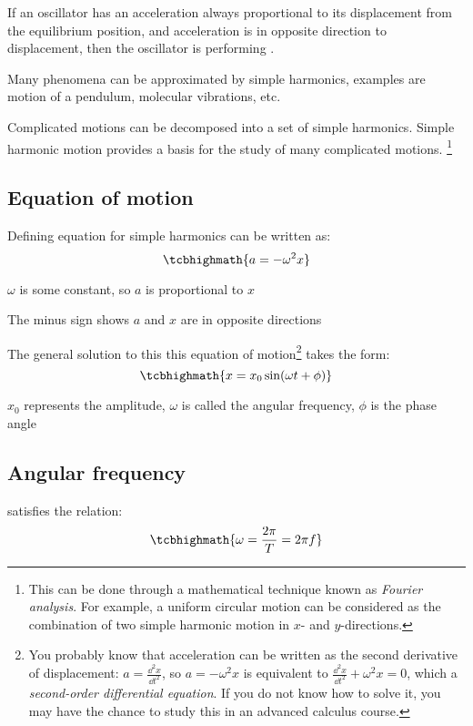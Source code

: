 \begin{ilight}
	If an oscillator has an acceleration always proportional to its displacement from the equilibrium position, and acceleration is in opposite direction to displacement, then the oscillator is performing .
\end{ilight}

Many phenomena can be approximated by simple harmonics, examples are motion of a pendulum, molecular vibrations, etc.

Complicated motions can be decomposed into a set of simple harmonics. Simple harmonic motion provides a basis for the study of many complicated motions.
\footnote{This can be done through a mathematical technique known as \emph{Fourier analysis}. For example, a uniform circular motion can be considered as the combination of two simple harmonic motion in $x$- and $y$-directions.}

\subsection{Equation of motion}

Defining equation for simple harmonics can be written as: $$\tcbhighmath{a=-\omega^2 x}$$

$\omega$ is some constant, so $a$ is proportional to $x$

The minus sign shows $a$ and $x$ are in opposite directions

\vspace*{\baselineskip} 

The general solution to this this equation of motion\footnote{You probably know that acceleration can be written as the second derivative of displacement: $a=\frac{\dd^2 x}{\dd t^2}$, so $a=-\omega^2 x$ is equivalent to $\frac{\dd^2 x}{\dd t^2} + \omega^2 x = 0$, which a \emph{second-order differential equation}. If you do not know how to solve it, you may have the chance to study this in an advanced calculus course.} takes the form: $$\tcbhighmath{x=x_0\sin(\omega t+\phi)}$$

$x_0$ represents the amplitude, $\omega$ is called the angular frequency, $\phi$ is the phase angle

\subsection*{Angular frequency}

\cmt {}  satisfies the relation: $$\tcbhighmath{\omega=\frac{2\pi}{T}=2\pi f}$$

